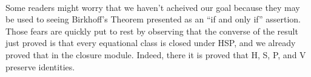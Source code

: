 \begin{code}
\AgdaSpace{}%
\AgdaSpace{}%
\AgdaSpace{}%
\<%
\\
%
\\[\AgdaEmptyExtraSkip]%
%
\>[3]\AgdaSpace{}%
\AgdaSymbol{:}\AgdaSpace{}%
\AgdaSpace{}%
\AgdaSpace{}%
\<%
\\
%
\>[3]\AgdaSpace{}%
\AgdaSymbol{=}\AgdaSpace{}%
\AgdaSymbol{(}\AgdaSpace{}%
\AgdaOperator{\AgdaInductiveConstructor{,}}\AgdaSpace{}%
\AgdaSpace{}%
\AgdaSpace{}%
\AgdaSpace{}%
\AgdaSpace{}%
\AgdaOperator{\AgdaInductiveConstructor{,}}\AgdaSpace{}%
\AgdaSymbol{(}\AgdaSpace{}%
\AgdaSpace{}%
\AgdaSpace{}%
\AgdaSpace{}%
\AgdaOperator{\AgdaInductiveConstructor{,}}\AgdaSpace{}%
\AgdaSpace{}%
\AgdaSymbol{)}\AgdaSpace{}%
\AgdaSymbol{)}\AgdaSpace{}%
\AgdaOperator{\AgdaInductiveConstructor{,}}\AgdaSpace{}%
\<%
\\
%
\\[\AgdaEmptyExtraSkip]%
%
\>[3]\AgdaSpace{}%
\AgdaSymbol{:}\AgdaSpace{}%
\AgdaSpace{}%
\AgdaSpace{}%
\<%
\\
%
\>[3]\AgdaSpace{}%
\AgdaSymbol{=}\AgdaSpace{}%
\AgdaSpace{}%
\AgdaSymbol{(}\AgdaSpace{}%
\AgdaSymbol{)}\AgdaSpace{}%
\<%
\end{code}
\ccpad
Some readers might worry that we haven't acheived our goal because they may be used to seeing Birkhoff's Theorem presented as an ``if and only if'' assertion. Those fears are quickly put to rest by observing that the converse of the result just proved is that every equational class is closed under HSP, and we already proved that in the closure module. Indeed, there it is proved that \ad H, \ad S, \ad P, and \ad V preserve identities.
